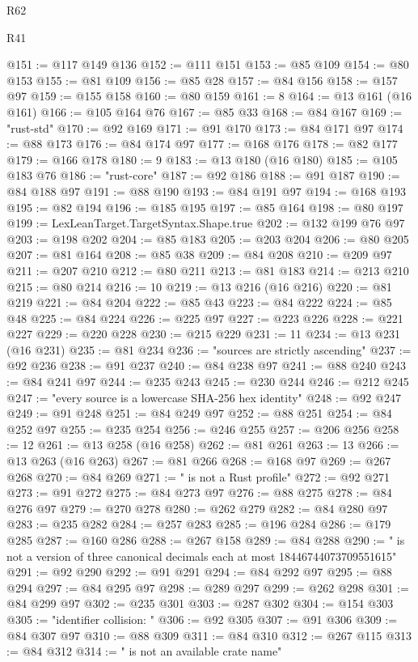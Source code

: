\begin{lexlean}{R62}
\begin{lexlean}{R41}
\begin{coremodule}
{{{{{{{{{{{{{{{{{{{{{{{{{{{{{{{{{{{{{{{{{{{{{{{{{{{{{{{{{{{{{{{{{{{{{{{{{{{{{{{{{{{{{{{@151 := @117 @149 @136
@152 := @111 @151
@153 := @85 @109
@154 := @80 @153
@155 := @81 @109
@156 := @85 @28
@157 := @84 @156
@158 := @157 @97
@159 := @155 @158
@160 := @80 @159
@161 := 8
@164 := @13 @161 (@16 @161)
@166 := @105 @164 @76
@167 := @85 @33
@168 := @84 @167
@169 := "rust-std"
@170 := @92 @169
@171 := @91 @170
@173 := @84 @171 @97
@174 := @88 @173
@176 := @84 @174 @97
@177 := @168 @176
@178 := @82 @177
@179 := @166 @178
@180 := 9
@183 := @13 @180 (@16 @180)
@185 := @105 @183 @76
@186 := "rust-core"
@187 := @92 @186
@188 := @91 @187
@190 := @84 @188 @97
@191 := @88 @190
@193 := @84 @191 @97
@194 := @168 @193
@195 := @82 @194
@196 := @185 @195
@197 := @85 @164
@198 := @80 @197
@199 := LexLeanTarget.TargetSyntax.Shape.true
@202 := @132 @199 @76 @97
@203 := @198 @202
@204 := @85 @183
@205 := @203 @204
@206 := @80 @205
@207 := @81 @164
@208 := @85 @38
@209 := @84 @208
@210 := @209 @97
@211 := @207 @210
@212 := @80 @211
@213 := @81 @183
@214 := @213 @210
@215 := @80 @214
@216 := 10
@219 := @13 @216 (@16 @216)
@220 := @81 @219
@221 := @84 @204
@222 := @85 @43
@223 := @84 @222
@224 := @85 @48
@225 := @84 @224
@226 := @225 @97
@227 := @223 @226
@228 := @221 @227
@229 := @220 @228
@230 := @215 @229
@231 := 11
@234 := @13 @231 (@16 @231)
@235 := @81 @234
@236 := "sources are strictly ascending"
@237 := @92 @236
@238 := @91 @237
@240 := @84 @238 @97
@241 := @88 @240
@243 := @84 @241 @97
@244 := @235 @243
@245 := @230 @244
@246 := @212 @245
@247 := "every source is a lowercase SHA-256 hex identity"
@248 := @92 @247
@249 := @91 @248
@251 := @84 @249 @97
@252 := @88 @251
@254 := @84 @252 @97
@255 := @235 @254
@256 := @246 @255
@257 := @206 @256
@258 := 12
@261 := @13 @258 (@16 @258)
@262 := @81 @261
@263 := 13
@266 := @13 @263 (@16 @263)
@267 := @81 @266
@268 := @168 @97
@269 := @267 @268
@270 := @84 @269
@271 := " is not a Rust profile"
@272 := @92 @271
@273 := @91 @272
@275 := @84 @273 @97
@276 := @88 @275
@278 := @84 @276 @97
@279 := @270 @278
@280 := @262 @279
@282 := @84 @280 @97
@283 := @235 @282
@284 := @257 @283
@285 := @196 @284
@286 := @179 @285
@287 := @160 @286
@288 := @267 @158
@289 := @84 @288
@290 := " is not a version of three canonical decimals each at most 18446744073709551615"
@291 := @92 @290
@292 := @91 @291
@294 := @84 @292 @97
@295 := @88 @294
@297 := @84 @295 @97
@298 := @289 @297
@299 := @262 @298
@301 := @84 @299 @97
@302 := @235 @301
@303 := @287 @302
@304 := @154 @303
@305 := "identifier collision: "
@306 := @92 @305
@307 := @91 @306
@309 := @84 @307 @97
@310 := @88 @309
@311 := @84 @310
@312 := @267 @115
@313 := @84 @312
@314 := " is not an available crate name"
}}}}}}}}}}}}}}}}}}}}}}}}}}}}}}}}}}}}}}}}}}}}}}}}}}}}}}}}}}}}}}}}}}}}}}}}}}}}}}}}}}}}}}}
\end{coremodule}
\end{lexlean}
\end{lexlean}
